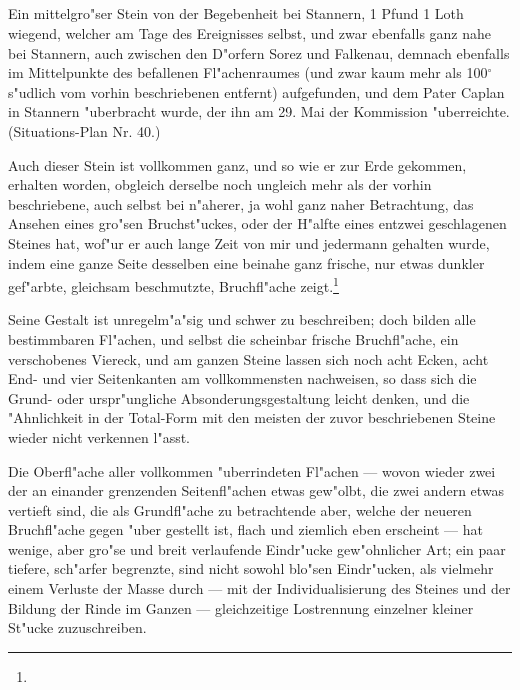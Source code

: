 \documentclass[a4paper, 11pt, oneside, german]{article}
\begin{document}
\subsection{}
\paragraph{}
Ein mittelgro"ser Stein von der Begebenheit bei Stannern, 1 Pfund 1 Loth wiegend, welcher am Tage des Ereignisses selbst, und zwar ebenfalls ganz nahe bei Stannern, auch zwischen den D"orfern Sorez und Falkenau, demnach ebenfalls im Mittelpunkte des befallenen Fl"achenraumes (und zwar kaum mehr als 100$^{\circ}$ s"udlich vom vorhin beschriebenen entfernt) aufgefunden, und dem Pater Caplan in Stannern "uberbracht wurde, der ihn am 29. Mai der Kommission "uberreichte. (Situations-Plan Nr. 40.)

Auch dieser Stein ist vollkommen ganz, und so wie er zur Erde gekommen, erhalten worden, obgleich derselbe noch ungleich mehr als der vorhin beschriebene, auch selbst bei n"aherer, ja wohl ganz naher Betrachtung, das Ansehen eines gro"sen Bruchst"uckes, oder der H"alfte eines entzwei geschlagenen Steines hat, wof"ur er auch lange Zeit von mir und jedermann gehalten wurde, indem eine ganze Seite desselben eine beinahe ganz frische, nur etwas dunkler gef"arbte, gleichsam beschmutzte, Bruchfl"ache zeigt.\footnote{}

Seine Gestalt ist unregelm"a"sig und schwer zu beschreiben; doch bilden alle bestimmbaren Fl"achen, und selbst die scheinbar frische Bruchfl"ache, ein verschobenes Viereck, und am ganzen Steine lassen sich noch acht Ecken, acht End- und vier Seitenkanten am vollkommensten nachweisen, so dass sich die Grund- oder urspr"ungliche Absonderungsgestaltung leicht denken, und die "Ahnlichkeit in der Total-Form mit den meisten der zuvor beschriebenen Steine wieder nicht verkennen l"asst.

Die Oberfl"ache aller vollkommen "uberrindeten Fl"achen --- wovon wieder zwei der an einander grenzenden Seitenfl"achen etwas gew"olbt, die zwei andern etwas vertieft sind, die als Grundfl"ache zu betrachtende aber, welche der neueren Bruchfl"ache gegen "uber gestellt ist, flach und ziemlich eben erscheint --- hat wenige, aber gro"se und breit verlaufende Eindr"ucke gew"ohnlicher Art; ein paar tiefere, sch"arfer begrenzte, sind nicht sowohl blo"sen Eindr"ucken, als vielmehr einem Verluste der Masse durch --- mit der Individualisierung des Steines und der Bildung der Rinde im Ganzen --- gleichzeitige Lostrennung einzelner kleiner St"ucke zuzuschreiben.
\end{document}
